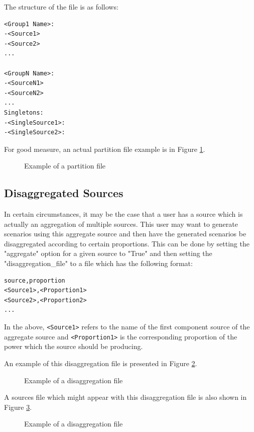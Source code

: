 \documentclass[11pt]{article}
\begin{document}
The structure of the file is as follows:
\begin{verbatim}
<Group1 Name>:
-<Source1>
-<Source2>
...

<GroupN Name>:
-<SourceN1>
-<SourceN2>
...
Singletons:
-<SingleSource1>:
-<SingleSource2>:
\end{verbatim}

For good measure, an actual partition file example is in Figure \ref{fig:partition}.

\begin{figure}[H]
	\begin{framed}
		
	\end{framed}
	\caption{Example of a partition file}
	\label{fig:partition}
\end{figure}

\subsection{Disaggregated Sources}
In certain circumstances, it may be the case that a user has a source which is actually an aggregation of multiple sources. This user may want to generate scenarios using this aggregate source and then have the generated scenarios be disaggregated according to certain proportions. This can be done by setting the "aggregate" option for a given source to "True" and then setting the "disaggregation\_file" to a file which has the following format:

\begin{verbatim}
source,proportion
<Source1>,<Proportion1>
<Source2>,<Proportion2>
...
\end{verbatim}
In the above, \texttt{<Source1>} refers to the name of the first component source of the aggregate source and \texttt{<Proportion1>} is the corresponding proportion of the power which the source should be producing.

An example of this disaggregation file is presented in Figure \ref{fig:disaggregation}.
\begin{figure}[H]
	\begin{framed}
		
	\end{framed}
	\caption{Example of a disaggregation file}
	\label{fig:disaggregation}
\end{figure}

A sources file which might appear with this disaggregation file is also shown in Figure \ref{fig:disaggregation-sources}.
\begin{figure}[H]
	\begin{framed}
		
	\end{framed}
	\caption{Example of a disaggregation file}
	\label{fig:disaggregation-sources}
\end{figure}

\fi
\end{document}

